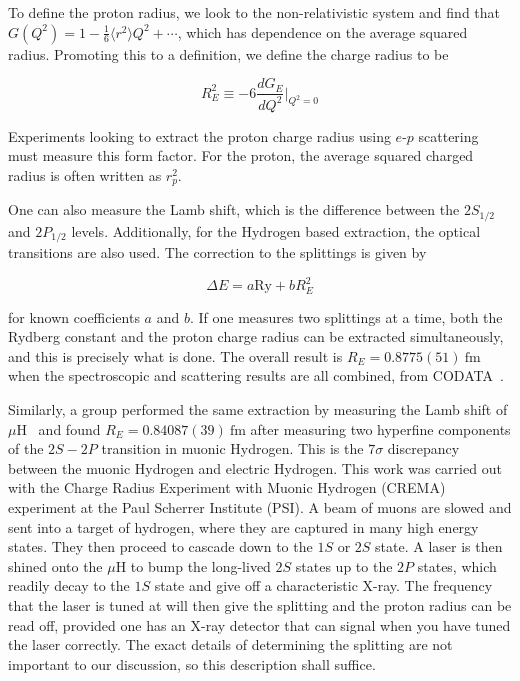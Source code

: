 To define the proton radius, we look to the non-relativistic system and find that $G(Q^2) = 1 - \frac{1}{6}\langle r^2 \rangle Q^2 + \cdots$, which has dependence on the average squared radius.
Promoting this to a definition, we define the charge radius to be

\begin{equation}
    R_E^2 \equiv -6 \frac{d G_E}{d Q^2}\rvert_{Q^2=0}
\end{equation}

\noindent Experiments looking to extract the proton charge radius using $e\textrm{-}p$ scattering must measure this form factor.
For the proton, the average squared charged radius is often written as $r_p^2$.

One can also measure the Lamb shift, which is the difference between the $2S_{1/2}$ and $2P_{1/2}$ levels.
Additionally, for the Hydrogen based extraction, the optical transitions are also used.
The correction to the splittings is given by

\begin{equation}
    \Delta E = a \textrm{Ry} + b R_E^2
\end{equation}

\noindent for known coefficients $a$ and $b$.
If one measures two splittings at a time, both the Rydberg constant and the proton charge radius can be extracted simultaneously, and this is precisely what is done.
The overall result is $R_E = 0.8775(51)~\textrm{fm}$ when the spectroscopic and scattering results are all combined, from CODATA~\cite{Mohr:2012tt}.

Similarly, a group performed the same extraction by measuring the Lamb shift of $\mu\textrm{H}$~\cite{Pohl:2010zza,Antognini:1900ns} and found $R_E = 0.84087(39)~\textrm{fm}$ after measuring two hyperfine components of the $2S-2P$ transition in muonic Hydrogen.
This is the $7\sigma$ discrepancy between the muonic Hydrogen and electric Hydrogen.
This work was carried out with the Charge Radius Experiment with Muonic Hydrogen (CREMA) experiment at the Paul Scherrer Institute (PSI).
A beam of muons are slowed and sent into a target of hydrogen, where they are captured in many high energy states.
They then proceed to cascade down to the $1S$ or $2S$ state.
A laser is then shined onto the $\mu\textrm{H}$ to bump the long-lived $2S$ states up to the $2P$ states, which readily decay to the $1S$ state and give off a characteristic X-ray.
The frequency that the laser is tuned at will then give the splitting and the proton radius can be read off, provided one has an X-ray detector that can signal when you have tuned the laser correctly.
The exact details of determining the splitting are not important to our discussion, so this description shall suffice.

